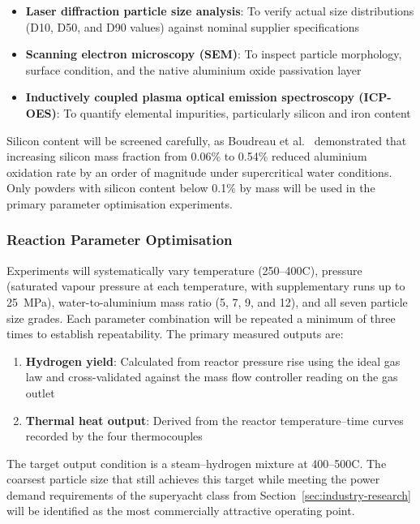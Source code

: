 \documentclass[12pt]{article}
\begin{document}
\begin{itemize}
    \item \textbf{Laser diffraction particle size analysis}: To verify actual size 
    distributions (D10, D50, and D90 values) against nominal supplier specifications

    \item \textbf{Scanning electron microscopy (SEM)}: To inspect particle 
    morphology, surface condition, and the native aluminium oxide passivation layer

    \item \textbf{Inductively coupled plasma optical emission spectroscopy 
    (ICP-OES)}: To quantify elemental impurities, particularly silicon and iron 
    content
\end{itemize}

Silicon content will be screened carefully, as Boudreau et al.~\cite{high-temp-metal-water-reactor-exp-Canada} 
demonstrated that increasing silicon mass fraction from 0.06\% to 0.54\% reduced 
aluminium oxidation rate by an order of magnitude under supercritical water 
conditions. Only powders with silicon content below 0.1\% by mass will be used in 
the primary parameter optimisation experiments.

\subsubsection*{Reaction Parameter Optimisation}

Experiments will systematically vary temperature (250--400\textdegree C), pressure 
(saturated vapour pressure at each temperature, with supplementary runs up to 
25~MPa), water-to-aluminium mass ratio (5, 7, 9, and 12), and all seven particle 
size grades. Each parameter combination will be repeated a minimum of three times 
to establish repeatability. The primary measured outputs are:

\begin{enumerate}
    \item \textbf{Hydrogen yield}: Calculated from reactor pressure rise using the 
    ideal gas law and cross-validated against the mass flow controller reading on 
    the gas outlet
    
    \item \textbf{Thermal heat output}: Derived from the reactor temperature--time 
    curves recorded by the four thermocouples
\end{enumerate}

The target output condition is a steam--hydrogen mixture at 400--500\textdegree C. 
The coarsest particle size that still achieves this target while meeting the power 
demand requirements of the superyacht class from 
Section~\ref{sec:industry-research} will be identified as the most commercially 
attractive operating point.
\end{document}
